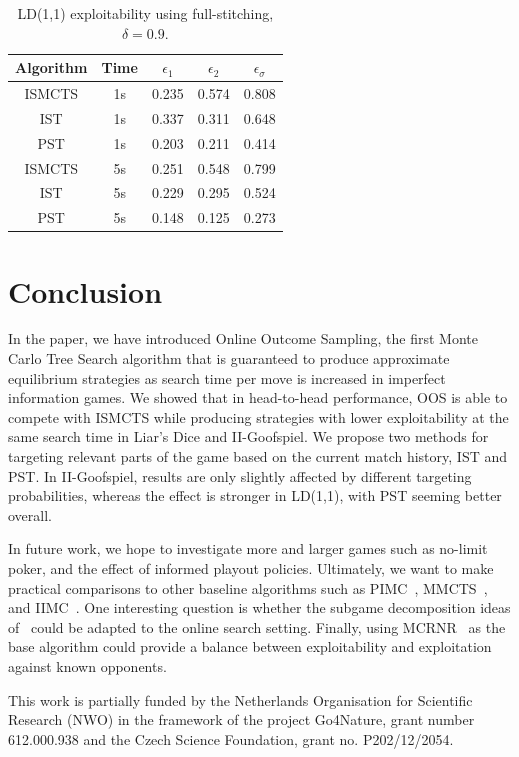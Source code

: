 \documentclass[letterpaper]{article}
\begin{document}
\begin{table}
{\small
\begin{center}
\begin{tabular}{ccccc}
Algorithm     & Time & $\epsilon_1$ & $\epsilon_2$ & $\epsilon_\sigma$ \\
\hline
ISMCTS        & 1s   & 0.235  & 0.574  & 0.808 \\
IST           & 1s   & 0.337  & 0.311  & 0.648 \\
PST           & 1s   & 0.203  & 0.211  & 0.414 \\
\hline
ISMCTS        & 5s   & 0.251  & 0.548  & 0.799 \\
IST           & 5s   & 0.229  & 0.295  & 0.524 \\
PST           & 5s   & 0.148  & 0.125  & 0.273 \\
\hline
\end{tabular}
\caption{LD(1,1) exploitability using full-stitching, $\delta = 0.9$.} 
\label{tbl:fullstitching}
\end{center}
}
\end{table}


\section{Conclusion}

In the paper, we have introduced Online Outcome Sampling, the first Monte Carlo 
Tree Search algorithm that is guaranteed to produce  
approximate equilibrium strategies as search time per move is increased in imperfect information games.
We showed that in head-to-head performance, OOS is able to compete with 
ISMCTS while producing strategies with lower exploitability
at the same search time in Liar's Dice and II-Goofspiel.
We propose two methods for targeting relevant parts of the game based on the current match history, 
IST and PST.
In II-Goofspiel, results are only slightly affected by different targeting probabilities, whereas the
effect is stronger in LD(1,1), with PST seeming better overall.

In future work, we hope to investigate more and larger games such as 
no-limit poker, and the effect of informed playout policies. 
Ultimately, we want to make practical comparisons to other 
baseline algorithms such as 
PIMC~\cite{Long10Understanding}, MMCTS~\cite{Auger11Multiple}, and IIMC~\cite{Furtak13Recursive}.
One interesting question is whether the subgame decomposition ideas of~\cite{Burch14Solving} could be 
adapted to the online search setting. 
Finally, using MCRNR~\cite{Ponsen11Computing} as the base algorithm could provide a balance between 
exploitability and exploitation against known opponents.

\vspace{0.2cm}

{\small {} This work is partially funded by the Netherlands Organisation for Scientific 
Research (NWO) in the framework of the project Go4Nature, grant number 612.000.938 and the Czech 
Science Foundation, grant no. P202/12/2054.}



\end{document}
